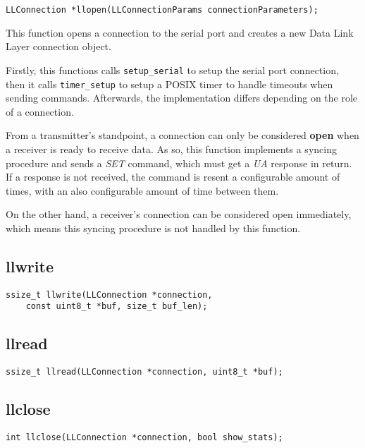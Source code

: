 \documentclass[11pt,a4paper]{article}
\begin{document}
\begin{lstlisting}
LLConnection *llopen(LLConnectionParams connectionParameters);
\end{lstlisting}

This function opens a connection to the serial port and creates a new Data Link Layer connection object.

Firstly, this functions calls \lstinline{setup_serial} to setup the serial port connection, then it calls \lstinline{timer_setup} to setup a POSIX timer to handle timeouts when sending commands.
Afterwards, the implementation differs depending on the role of a connection.

From a transmitter's standpoint, a connection can only be considered \textbf{open} when a receiver is ready to receive data.
As so, this function implements a syncing procedure and sends a \textit{SET} command, which must get a \textit{UA} response in return.
If a response is not received, the command is resent a configurable amount of times, with an also configurable amount of time between them.

On the other hand, a receiver's connection can be considered open immediately, which means this syncing procedure is not handled by this function.

\subsection{llwrite}

\begin{lstlisting}
ssize_t llwrite(LLConnection *connection, 
    const uint8_t *buf, size_t buf_len);
\end{lstlisting}

\subsection{llread}

\begin{lstlisting}
ssize_t llread(LLConnection *connection, uint8_t *buf);
\end{lstlisting}

\subsection{llclose}

\begin{lstlisting}
int llclose(LLConnection *connection, bool show_stats);
\end{lstlisting}
\end{document}
